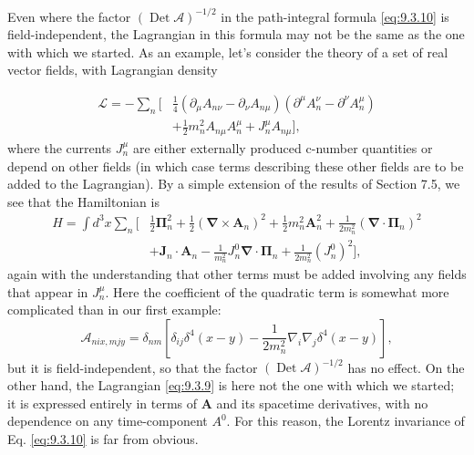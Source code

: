 \begin{sloppypar}
Even where the factor $(\operatorname{Det}\mathcal A)^{-1/2}$ in the
path-integral formula \eqref{eq:9.3.10} is field-independent, the Lagrangian in this
formula may not be the same as the one with which we started. As an example,
let's consider the theory of a set of real vector fields, with Lagrangian
density
\end{sloppypar}
\begin{align*}
\mathcal L=-\sum_n\biggl[&\frac14(\partial_\mu A_{n\nu}-\partial_\nu A_{n\mu})
 (\partial^\mu A_n^\nu-\partial^\nu A_n^\mu)
\\
&+\frac12m_n^2A_{n\mu}A_n^\mu+J_n^\mu A_{n\mu}\biggr],
\end{align*}
where the currents $J_n^\mu$ are either externally produced c-number
quantities or depend on other fields (in which case terms describing these
other fields are to be added to the Lagrangian). By a simple extension of the
results of Section 7.5, we see that the Hamiltonian is
\begin{align*}
H=\int d^3x\sum_n\biggl[&\frac12\boldsymbol\Pi_n^2
 +\frac12(\boldsymbol\nabla\times\mathbf A_n)^2
 +\frac12m_n^2\mathbf A_n^2
 +\frac{1}{2m_n^2}(\boldsymbol\nabla\cdot\boldsymbol\Pi_n)^2
\\
&+\mathbf J_n\cdot\mathbf A_n
 -\frac{1}{m_n^2}J_n^0\boldsymbol\nabla\cdot\boldsymbol\Pi_n
 +\frac{1}{2m_n^2}(J_n^0)^2\biggr],
\end{align*}
again with the understanding that other terms must be added involving any
fields that appear in $J_n^\mu$. Here the coefficient of the quadratic term is
somewhat more complicated than in our first example:
\[
\mathcal A_{nix,mjy}=\delta_{nm}\left[\delta_{ij}\delta^4(x-y)
 -\frac{1}{2m_n^2}\nabla_i\nabla_j\delta^4(x-y)\right],
\]
but it is field-independent, so that the factor
$(\operatorname{Det}\mathcal A)^{-1/2}$ has no effect. On the other hand, the
Lagrangian \eqref{eq:9.3.9} is here not the one with which we started; it is expressed
entirely in terms of $\mathbf A$ and its spacetime derivatives, with no
dependence on any time-component $A^0$. For this reason, the Lorentz invariance
of Eq. \eqref{eq:9.3.10} is far from obvious.

